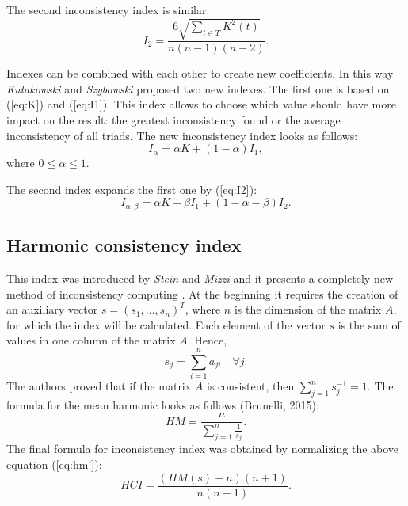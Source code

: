 The second inconsistency index is similar:
	\begin{equation} 
		I_{2}=\frac{6\sqrt{\sum_{t\in T}K^{2}(t)}}{n(n-1)(n-2)}.
	 \end{equation}

Indexes can be combined with each other to create new coefficients. In this way \textit{Kułakowski} and \textit{Szybowski} proposed two new indexes. The first one is based on ([eq:K]) and ([eq:I1]). This index allows to choose which value should have more impact on the result: the greatest inconsistency found or the average inconsistency of all triads. The new inconsistency index looks as follows:
	\begin{equation} 
		I_{\alpha}=\alpha K+(1-\alpha)I_{1},
	 \end{equation}
 where $0\leq\alpha\leq1$.
  
The second index expands the first one by ([eq:I2]):
	\begin{equation} 
		I_{\alpha,\beta}=\alpha K+\beta I_{1}+(1-\alpha-\beta)I_{2}.
	 \end{equation}
 

\subsection{Harmonic consistency index}

This index was introduced by \textit{Stein} and \textit{Mizzi} and it presents a completely new method of inconsistency computing \cite{STEIN2007}. At the beginning it requires the creation of an auxiliary vector $s=(s_{1},...,s_{n})^{T}$, where $n$ is the dimension of the matrix $A$, for which the index will be calculated. Each element of the vector $s$ is the sum of values in one column of the matrix $A$. Hence, 
	\begin{equation} 
		s_{j}=\sum_{i=1}^{n}a_{ji}\,\,\,\,\,\,\forall j.
	 \end{equation}
 The authors proved that if the matrix $A$ is consistent, then $\sum_{j=1}^{n}s_{j}^{-1}=1$. The formula for the mean harmonic looks as follows (Brunelli, 2015):
 	\begin{equation} 
		HM=\frac{n}{\sum_{j=1}^{n}\frac{1}{s_{j}}}.
	 \end{equation}
 The final formula for inconsistency index was obtained by normalizing the above equation ([eq:hm']):
 	\begin{equation} 
		HCI=\frac{\left(HM(s)-n\right)\left(n+1\right)}{n(n-1)}.
	 \end{equation}
 

